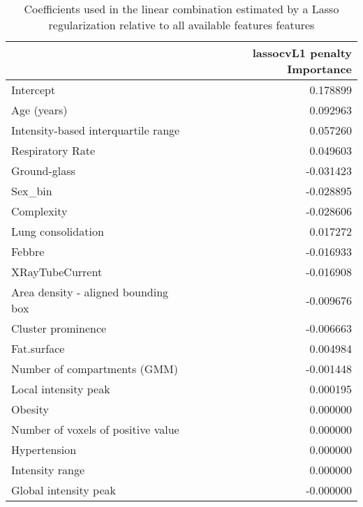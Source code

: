 \begin{table}
	\caption{Coefficients used in the linear combination estimated by a Lasso regularization relative to all available features features\label{tab:ParamAll}}
		\centering
			\begin{tabular}{lr}
			\toprule
			{} &  lassocvL1 penalty Importance \\
			\midrule
			Intercept                           &                      0.178899 \\
			Age (years)                         &                      0.092963 \\
			Intensity-based interquartile range &                      0.057260 \\
			Respiratory Rate                    &                      0.049603 \\
			Ground-glass                        &                     -0.031423 \\
			Sex\_bin                             &                     -0.028895 \\
			Complexity                          &                     -0.028606 \\
			Lung consolidation                  &                      0.017272 \\
			Febbre                              &                     -0.016933 \\
			XRayTubeCurrent                     &                     -0.016908 \\
			Area density - aligned bounding box &                     -0.009676 \\
			Cluster prominence                  &                     -0.006663 \\
			Fat.surface                         &                      0.004984 \\
			Number of compartments (GMM)        &                     -0.001448 \\
			Local intensity peak                &                      0.000195 \\
			Obesity                             &                      0.000000 \\
			Number of voxels of positive value  &                      0.000000 \\
			Hypertension                        &                      0.000000 \\
			Intensity range                     &                      0.000000 \\
			Global intensity peak               &                     -0.000000 \\

\end{tabular}
\end{table}
